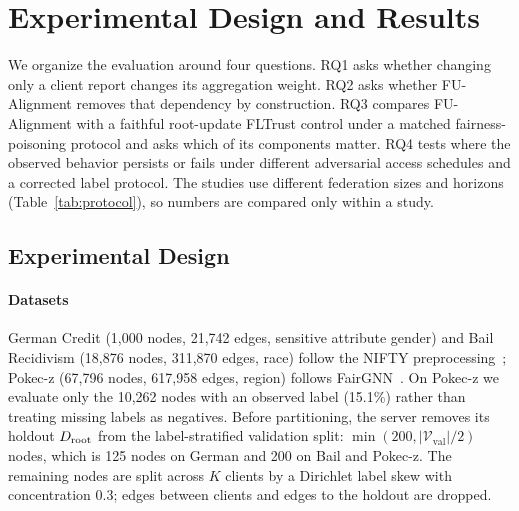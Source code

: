 \section{Experimental Design and Results}
\label{sec:experiments}

We organize the evaluation around four questions. RQ1 asks whether changing only a client report changes its aggregation weight. RQ2 asks whether FU-Alignment removes that dependency by construction. RQ3 compares FU-Alignment with a faithful root-update FLTrust control under a matched fairness-poisoning protocol and asks which of its components matter. RQ4 tests where the observed behavior persists or fails under different adversarial access schedules and a corrected label protocol. The studies use different federation sizes and horizons (Table~\ref{tab:protocol}), so numbers are compared only within a study.

\subsection{Experimental Design}
\label{subsec:setup}

\paragraph{Datasets}
German Credit (1,000 nodes, 21,742 edges, sensitive attribute gender) and Bail Recidivism (18,876 nodes, 311,870 edges, race) follow the NIFTY preprocessing~\citep{agarwal2021towards}; Pokec-z (67,796 nodes, 617,958 edges, region) follows FairGNN~\citep{dai2021say,takac2012data}. On Pokec-z we evaluate only the 10,262 nodes with an observed label (15.1\%) rather than treating missing labels as negatives. Before partitioning, the server removes its holdout $D_{\mathrm{root}}$ from the label-stratified validation split: $\min(200, |\mathcal{V}_{\mathrm{val}}|/2)$ nodes, which is 125 nodes on German and 200 on Bail and Pokec-z. The remaining nodes are split across $K$ clients by a Dirichlet label skew with concentration 0.3; edges between clients and edges to the holdout are dropped.


